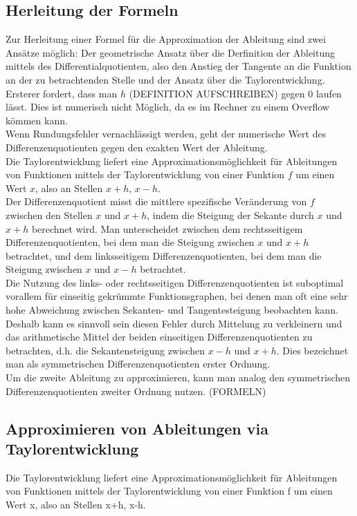 \documentclass{scrartcl}
\begin{document}
\subsection{Herleitung der Formeln}
\label{ssec:herleitung}
Zur Herleitung einer Formel für die Approximation der Ableitung sind zwei Ansätze möglich: Der geometrische Ansatz über die Derfinition der Ableitung mittels des Differentialquotienten, also den Anstieg der Tangente an die Funktion an der zu betrachtenden Stelle und der Ansatz über die Taylorentwicklung. Ersterer fordert, dass man $h$ (DEFINITION AUFSCHREIBEN) gegen 0 laufen lässt. Dies ist numerisch nicht Möglich, da es im Rechner zu einem Overflow kömmen kann.\\
Wenn Rundungsfehler vernachlässigt werden, geht der numerische Wert des Differenzenquotienten gegen den exakten Wert der Ableitung. \\
Die Taylorentwicklung liefert eine Approximationsmöglichkeit für Ableitungen von Funktionen mittels der Taylorentwicklung von einer Funktion $f$ um einen Wert $x$, also an Stellen $x+h$, $x-h$.\\
Der Differenzenquotient misst die mittlere spezifische Veränderung von $f$ zwischen den Stellen $x$ und $x+h$, indem die Steigung der Sekante durch $x$ und $x+h$ berechnet wird. Man unterscheidet zwischen dem rechtsseitigem Differenzenquotienten, bei dem man die Steigung zwischen $x$ und $x+h$ betrachtet, und dem linksseitigem Differenzenquotienten, bei dem man die Steigung zwischen $x$ und $x-h$ betrachtet.\\
Die Nutzung des links- oder rechtsseitigen Differenzenquotienten ist suboptimal vorallem für einseitig gekrümmte Funktionsgraphen, bei denen man oft eine sehr hohe Abweichung zwischen Sekanten- und Tangentesteigung beobachten kann. Deshalb kann es sinnvoll sein diesen Fehler durch Mittelung zu verkleinern und das arithmetische Mittel der beiden einseitigen Differenzenquotienten zu betrachten, d.h. die Sekantensteigung zwischen $x-h$ und $x+h$. Dies bezeichnet man als symmetrischen Differenzenquotienten erster Ordnung.\\
Um die zweite Ableitung zu approximieren, kann man analog den symmetrischen Differenzenquotienten zweiter Ordnung nutzen. (FORMELN)\\

\subsection{Approximieren von Ableitungen via Taylorentwicklung}
\label{ssec:herleitung2}
Die Taylorentwicklung liefert eine Approximationsmöglichkeit für Ableitungen von Funktionen mittels der Taylorentwicklung von einer Funktion f um einen Wert x, also an Stellen x+h, x-h.
\end{document}
